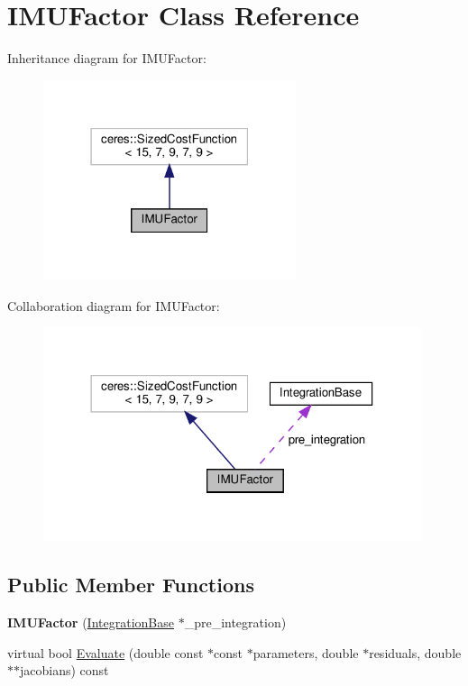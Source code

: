 \hypertarget{classIMUFactor}{}\section{I\+M\+U\+Factor Class Reference}
\label{classIMUFactor}


Inheritance diagram for I\+M\+U\+Factor\+:\nopagebreak
\begin{figure}[H]
\begin{center}
\leavevmode
\includegraphics[width=210pt]{classIMUFactor__inherit__graph}
\end{center}
\end{figure}


Collaboration diagram for I\+M\+U\+Factor\+:\nopagebreak
\begin{figure}[H]
\begin{center}
\leavevmode
\includegraphics[width=314pt]{classIMUFactor__coll__graph}
\end{center}
\end{figure}
\subsection*{Public Member Functions}
\begin{DoxyCompactItemize}
\item 
\mbox{\label{classIMUFactor_acb54d6e7d50b11a96fe60deee6fba9e1}} 
{\bfseries I\+M\+U\+Factor} (\hyperlink{classIntegrationBase}{Integration\+Base} $\ast$\+\_\+pre\+\_\+integration)
\item 
virtual bool \hyperlink{classIMUFactor_a7d49766bb73f577bcd11efdd31f7fc8b}{Evaluate} (double const $\ast$const $\ast$parameters, double $\ast$residuals, double $\ast$$\ast$jacobians) const
\end{DoxyCompactItemize}
